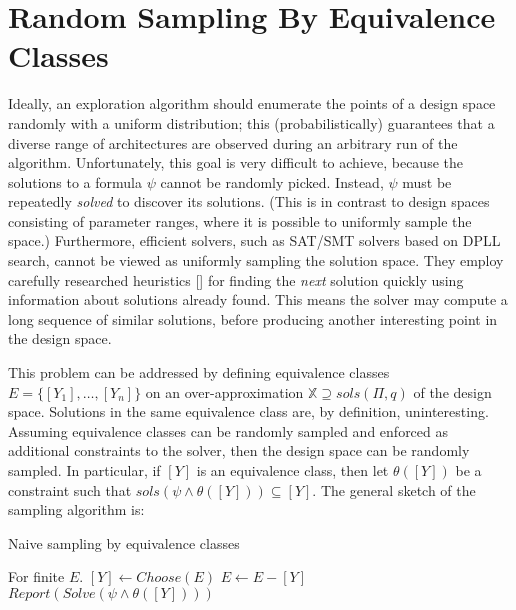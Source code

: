 \documentclass[conference]{IEEEtran}
\newcommand{\sols}[1]{\mathit{sols}(#1)}
\begin{document}
\section{Random Sampling By Equivalence Classes}
Ideally, an exploration algorithm should enumerate the points of a design space randomly with a uniform distribution; this (probabilistically) guarantees that a diverse range of architectures are observed during an arbitrary run of the algorithm. Unfortunately, this goal is very difficult to achieve, because the solutions to a formula $\psi$ cannot be randomly picked. Instead, $\psi$ must be repeatedly \textit{solved} to discover its solutions. (This is in contrast to design spaces consisting of parameter ranges, where it is possible to uniformly sample the space.) Furthermore, efficient solvers, such as SAT/SMT solvers based on DPLL search, cannot be viewed as uniformly sampling the solution space. They employ carefully researched heuristics [] for finding the \textit{next} solution quickly using information about solutions already found. This means the solver may compute a long sequence of similar solutions, before producing another interesting point in the design space.

This problem can be addressed by defining equivalence classes $E = \{[Y_1],\ldots,[Y_n]\}$ on an over-approximation $\mathbb{X} \supseteq \sols{\Pi,q}$ of the design space. Solutions in the same equivalence class are, by definition, uninteresting. Assuming equivalence classes can be randomly sampled and enforced as additional constraints to the solver, then the design space can be randomly sampled. In particular, if $[Y]$ is an equivalence class, then let $\theta([Y])$ be a constraint such that $\sols{\psi \wedge \theta([Y])} \subseteq [Y]$. The general sketch of the sampling algorithm is:
\begin{algorithm}
\caption{Naive sampling by equivalence classes}
\label{alg:naive}
\begin{algorithmic}[1]
\Comment For finite $E$.
\State $[Y] \gets C\!hoose(E)$
\State $E \gets E - [Y]$
\State $Report(Solve(\psi \wedge \theta([Y])))$
\EndIf
\EndWhile
\EndProcedure
\end{algorithmic}
\end{algorithm}
\end{document}
